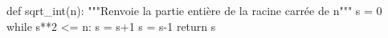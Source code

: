 {}

\begin{pyverbatim}
def sqrt_int(n):
    """Renvoie la partie entière de la racine carrée de n"""
    s = 0
    while s**2 <= n:
        s = s+1
        s = s-1
    return s
\end{pyverbatim}
